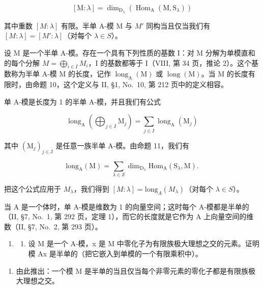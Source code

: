 \[
[ \mathrm{M}: \lambda ] = \dim_ {\mathrm{D} _ {\lambda}} (\operatorname{Hom} _ {\mathrm{A}} (\mathrm{M}, \mathrm{S} _ {\lambda}))\tag{12}
\]

其中重数 \([M : \lambda]\) 有限。半单 A-模 M 与 \(M'\) 同构当且仅当我们有 \([M : \lambda] = [M' : \lambda]\)（对每个 \(\lambda \in S\)）。

设 M 是一个半单 A-模。存在一个具有下列性质的基数 I：对 M 分解为单模直和的每个分解 \(M = \bigoplus_{i \in I} M_i\)，I 的基数都等于 I（VIII, 第 34 页，推论 2）。这个基数称为半单 A-模 M 的长度，记作 \(\operatorname{long}_{\mathrm{A}}(\mathrm{M})\) 或 \(\operatorname{long}(\mathrm{M})\)。当 M 的长度有限时，由命题 10，这个定义与 II, §1, No.~10, 第 212 页中的定义相容。

单 A-模是长度为 1 的半单 A-模，并且我们有公式

\[
\operatorname{long} _ {\mathrm{A}} \left(\bigoplus_ {j \in \mathrm{J}} \mathrm{M} _ {j}\right) = \sum_ {j \in \mathrm{J}} \operatorname{long} _ {\mathrm{A}} (\mathrm{M} _ {j})\tag{13}
\]

其中 \((\mathrm{M}_j)_{j\in \mathrm{J}}\) 是任意一族半单 A-模。由命题 11，我们有

\[
\mathrm{long} _ {\mathrm{A}} (\mathrm{M}) = \sum_ {\lambda \in \mathcal {S}} \dim_ {\mathrm{D} _ {\lambda}} \mathrm{Hom} _ {\mathrm{A}} (\mathrm{S} _ {\lambda}, \mathrm{M}).\tag{14}
\]

把这个公式应用于 \(M_{\lambda}\)，我们得到 \([M : \lambda] = \text{long}_{A}(M_{\lambda})\)（对每个 \(\lambda \in S\)）。

当 A 是一个体时，单 A-模是维数为 1 的向量空间；这时每个 A-模都是半单的（II, §7, No.~1, 第 292 页，定理 1），而它的长度就是它作为 A 上向量空间的维数（II, §7, No.~2, 第 293 页）。


\begin{enumerate}
\def\labelenumi{\arabic{enumi})}
\tightlist
\item
  \begin{enumerate}
  \def\labelenumii{\alph{enumii})}
  \tightlist
  \item
    设 M 是一个 A-模，x 是 M 中零化子为有限族极大理想之交的元素。证明模 Ax 是半单的（把它嵌入到单模的一个有限乘积中）。
  \end{enumerate}
\end{enumerate}

\begin{enumerate}
\def\labelenumi{\alph{enumi})}
\setcounter{enumi}{1}
\tightlist
\item
  由此推出：一个模 M 是半单的当且仅当每个非零元素的零化子都是有限族极大理想之交。
\end{enumerate}

